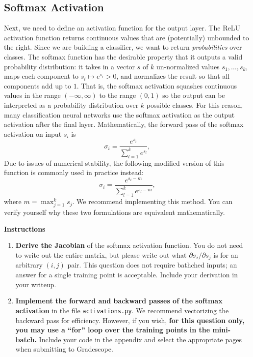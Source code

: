 \documentclass{article}
\begin{document}
\newpage
\subsection{Softmax Activation}
Next, we need to define an activation function for the output layer. 
The ReLU activation function returns continuous values that are (potentially) unbounded to the right. 
Since we are building a classifier, we want to return \textit{probabilities} over classes. 
The softmax function has the desirable property that it outputs a valid probability distribution: it takes in a vector $s$ of $k$ un-normalized values $s_1, \ldots, s_k$, maps each component to $s_i \mapsto e^{s_i} > 0$, and normalizes the result so that all components add up to $1$. 
That is, the softmax activation squashes continuous values in the range $(-\infty, \infty)$ to the range $(0, 1)$ so the output can be interpreted as a probability distribution over $k$ possible classes. 
For this reason, many classification neural networks use the softmax activation as the output activation after the final layer. 
Mathematically, the forward pass of the softmax activation on input $s_i$ is 
\[
    \sigma_i = \frac{e^{s_i}}{\sum_{l=1}^{k} e^{s_l}},
\]
Due to issues of numerical stability, the following modified version of this function is commonly used in practice instead:
\[
    \sigma_i = \frac{e^{s_i - m}}{\sum_{l=1}^{k} e^{s_l-m}},
\]
where $m = \max_{j=1}^k s_j$. 
We recommend implementing this method. 
You can verify yourself why these two formulations are equivalent mathematically.

\textbf{Instructions}
\begin{enumerate}
    \item 
    \textbf{Derive the Jacobian} of the softmax activation function. 
    You do not need to write out the entire matrix, but please write out what $\partial \sigma_i/\partial s_j$ is for an arbitrary $(i, j)$ pair. 
    This question does not require bathched inputs; an answer for a single training point is acceptable. 
    Include your derivation in your writeup.

    \item 
    \textbf{Implement the forward and backward passes of the softmax activation} in the file \texttt{activations.py}. 
    We recommend vectorizing the backward pass for efficiency. 
    However, if you wish, \textbf{for this question only, you may use a ``for'' loop over the training points in the mini-batch.} 
    Include your code in the appendix and select the appropriate pages when submitting to Gradescope.
\end{enumerate}
\end{document}
